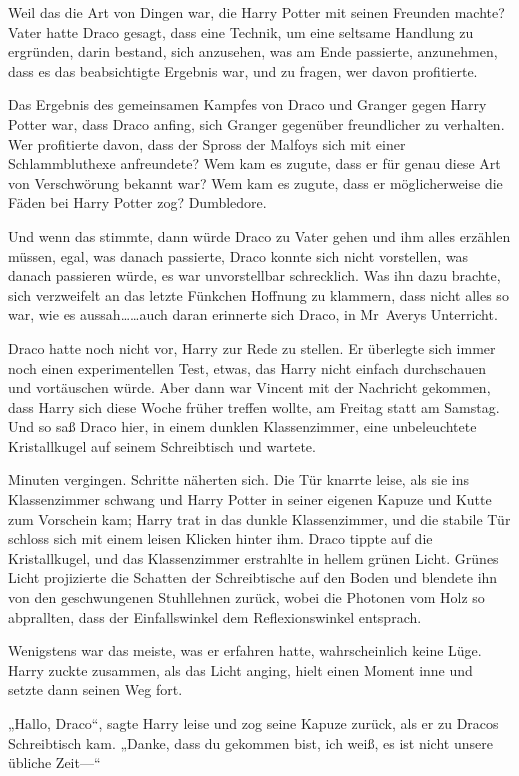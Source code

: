 {Weil das die Art von Dingen war, die Harry Potter mit seinen Freunden machte? Vater hatte Draco gesagt, dass eine Technik, um eine seltsame Handlung zu ergründen, darin bestand, sich anzusehen, was am Ende passierte, anzunehmen, dass es das beabsichtigte Ergebnis war, und zu fragen, wer davon profitierte.

Das Ergebnis des gemeinsamen Kampfes von Draco und Granger gegen Harry Potter war, dass Draco anfing, sich Granger gegenüber freundlicher zu verhalten. Wer profitierte davon, dass der Spross der Malfoys sich mit einer Schlammbluthexe anfreundete? Wem kam es zugute, dass er für genau diese Art von Verschwörung bekannt war? Wem kam es zugute, dass er möglicherweise die Fäden bei Harry Potter zog? Dumbledore.

Und wenn das stimmte, dann würde Draco zu Vater gehen und ihm alles erzählen müssen, egal, was danach passierte, Draco konnte sich nicht vorstellen, was danach passieren würde, es war unvorstellbar schrecklich. Was ihn dazu brachte, sich verzweifelt an das letzte Fünkchen Hoffnung zu klammern, dass nicht alles so war, wie es aussah……auch daran erinnerte sich Draco, in Mr~Averys Unterricht.

Draco hatte noch nicht vor, Harry zur Rede zu stellen. Er überlegte sich immer noch einen experimentellen Test, etwas, das Harry nicht einfach durchschauen und vortäuschen würde. Aber dann war Vincent mit der Nachricht gekommen, dass Harry sich diese Woche früher treffen wollte, am Freitag statt am Samstag. Und so saß Draco hier, in einem dunklen Klassenzimmer, eine unbeleuchtete Kristallkugel auf seinem Schreibtisch und wartete.

Minuten vergingen. Schritte näherten sich. Die Tür knarrte leise, als sie ins Klassenzimmer schwang und Harry Potter in seiner eigenen Kapuze und Kutte zum Vorschein kam; Harry trat in das dunkle Klassenzimmer, und die stabile Tür schloss sich mit einem leisen Klicken hinter ihm. Draco tippte auf die Kristallkugel, und das Klassenzimmer erstrahlte in hellem grünen Licht. Grünes Licht projizierte die Schatten der Schreibtische auf den Boden und blendete ihn von den geschwungenen Stuhllehnen zurück, wobei die Photonen vom Holz so abprallten, dass der Einfallswinkel dem Reflexionswinkel entsprach.

Wenigstens war das meiste, was er erfahren hatte, wahrscheinlich keine Lüge. Harry zuckte zusammen, als das Licht anging, hielt einen Moment inne und setzte dann seinen Weg fort.

„Hallo, Draco“, sagte Harry leise und zog seine Kapuze zurück, als er zu Dracos Schreibtisch kam. „Danke, dass du gekommen bist, ich weiß, es ist nicht unsere übliche Zeit—“

}
